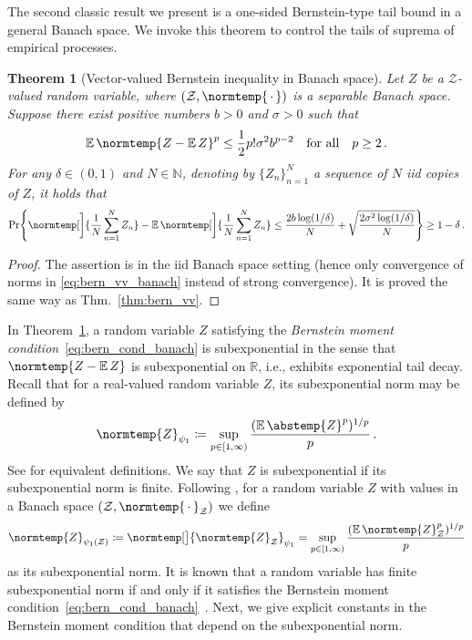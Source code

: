 \documentclass{article}
\theoremstyle{plain}
\newtheorem{theorem}{Theorem}[section]
\theoremstyle{my_def}
\theoremstyle{my_rem}
\numberwithin{equation}{section}
\numberwithin{theorem}{section}%
\newcommand{\R}{\mathbb{R}}
\newcommand{\E}{\mathbb{E}}
\newcommand{\N}{\mathbb{N}}
\newcommand{\cZ}{\mathcal{Z}}
\let\originalleft\left %
\let\originalright\right
\renewcommand{\left}{\mathopen{}\mathclose\bgroup\originalleft}
\renewcommand{\right}{\aftergroup\egroup\originalright}
\newcommand{\norm}{\normtemp}
\newcommand{\abs}{\abstemp}
\newcommand{\slot}{{\,\cdot\,}}
\newcommand{\defeq}{\coloneqq} %
\renewcommand{\E}{\operatorname{\mathbb{E}}} %
\begin{document}
The second classic result we present is a one-sided Bernstein-type tail bound in a general Banach space. We invoke this theorem to control the tails of suprema of empirical processes.
\begin{theorem}[Vector-valued Bernstein inequality in Banach space]\label{thm:bern_vv_banach}
Let $Z$ be a $\cZ$-valued random variable, where $(\cZ,\norm{\slot})$ is a separable Banach space. Suppose there exist positive numbers $b>0$ and $\sigma>0$ such that 
\begin{equation}\label{eq:bern_cond_banach}
    \E\norm{Z-\E Z}^p\leq \frac{1}{2}p!\sigma^2 b^{p-2} \quad\text{for all}\quad p\geq 2\,.
\end{equation}
For any $\delta\in(0,1)$ and $N\in\N$, denoting by $\{Z_n\}_{n=1}^N$ a sequence of $N$ iid copies of $Z$, it holds that
\begin{equation}\label{eq:bern_vv_banach}
    \Pr\left\{\norm[\bigg]{\frac{1}{N}\sum_{n=1}^NZ_n} - \E \norm[\bigg]{\frac{1}{N}\sum_{n=1}^NZ_n}\leq \frac{2b\log(1/\delta)}{N} + \sqrt{\frac{2\sigma^2\log(1/\delta)}{N}}\right\}\geq 1-\delta\,.
\end{equation}
\end{theorem}
\begin{proof}
    The assertion is \cite[Cor. 1, p. 144]{pinelis1986remarks} in the iid Banach space setting (hence only convergence of norms in \eqref{eq:bern_vv_banach} instead of strong convergence). It is proved the same way as Thm.~\ref{thm:bern_vv}.
\end{proof}
In Theorem~\ref{thm:bern_vv_banach}, a random variable $Z$ satisfying the \emph{Bernstein moment condition}~\eqref{eq:bern_cond_banach} is subexponential in the sense that $\norm{Z-\E Z}$ is subexponential on $\R$, i.e., exhibits exponential tail decay. Recall that for a real-valued random variable $Z$, its subexponential norm may be defined by
\begin{equation}\label{eq:app_def_subexp_subgauss_norm}
    \norm{Z}_{\psi_1}\defeq \sup_{p\in[1,\infty)}\frac{(\E\abs{Z}^p)^{1/p}}{p} \,.
\end{equation}
See \cite[Sect. 2.7]{vershynin2018high} for equivalent definitions. We say that $Z$ is subexponential if its subexponential norm is finite. Following \cite[Sect. 4.3, pp. 19--20]{mollenhauer2022learning}, for a random variable $Z$ with values in a Banach space $ (\cZ,\norm{\slot}_\cZ) $ we define
\begin{equation}\label{eq:app_def_subexp_norm_vec}
    \norm{Z}_{\psi_1(\cZ)}\defeq \norm[\big]{\norm{Z}_\cZ}_{\psi_1}=\sup_{p\in[1,\infty)}\frac{(\E\norm{Z}_{\cZ}^p)^{1/p}}{p}
\end{equation}
as its subexponential norm. It is known that a random variable has finite subexponential norm if and only if it satisfies the Bernstein moment condition~\eqref{eq:bern_cond_banach}~\cite[see, e.g.,][Appendix A.2]{mollenhauer2022learning}. Next, we give explicit constants in the Bernstein moment condition that depend on the subexponential norm.
\end{document}
